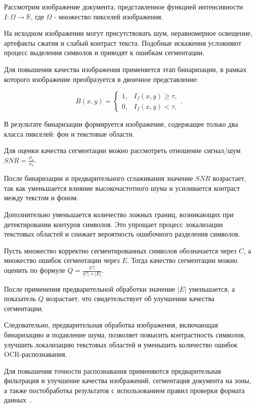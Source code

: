 \documentclass[14pt,a4paper]{extarticle}
\newenvironment{my_proof}
{\par\indent\noindent{Доказательство.} \upshape}
{\par\hfill $\square$}
\begin{document}
\begin{my_proof}
Рассмотрим изображение документа,
представленное функцией интенсивности $I : \Omega \rightarrow \mathbb{R}$, где $\Omega$ - множество пикселей изображения.

На исходном изображении могут присутствовать шум,
неравномерное освещение,
артефакты сжатия и слабый контраст текста.
Подобные искажения усложняют процесс выделения символов
и приводят к ошибкам сегментации.

Для повышения качества изображения
применяется этап бинаризации,
в рамках которого изображение преобразуется
в двоичное представление:

\begin{equation*}
B(x,y)=
\begin{cases}
1, & I_f(x,y) \geq \tau, \\
0, & I_f(x,y) < \tau,
\end{cases}.    
\end{equation*}

В результате бинаризации
формируется изображение,
содержащее только два класса пикселей:
фон и текстовые области.

Для оценки качества сегментации
можно рассмотреть отношение сигнал/шум $SNR=\frac{\mu_s}{\sigma_n}$.

После бинаризации и предварительного сглаживания
значение $SNR$ возрастает,
так как уменьшается влияние высокочастотного шума
и усиливается контраст между текстом и фоном.

Дополнительно уменьшается количество ложных границ,
возникающих при детектировании контуров символов.
Это упрощает процесс локализации текстовых областей
и снижает вероятность ошибочного разделения символов.

Пусть множество корректно сегментированных символов
обозначается через $C$,
а множество ошибок сегментации через $E$.
Тогда качество сегментации можно оценить по формуле 
$Q=\frac{|C|}{|C|+|E|}.$

После применения предварительной обработки
значение $|E|$ уменьшается,
а показатель $Q$ возрастает,
что свидетельствует об улучшении качества сегментации.

Следовательно,
предварительная обработка изображения,
включающая бинаризацию и подавление шума,
позволяет повысить контрастность символов,
улучшить локализацию текстовых областей
и уменьшить количество ошибок OCR-распознавания.
\end{my_proof}

Для повышения точности распознавания применяются предварительная фильтрация и улучшение качества изображений, сегментация документа на зоны, а также постобработка результатов с использованием правил проверки формата данных~\cite{mikhailov2014}.
\end{document}
